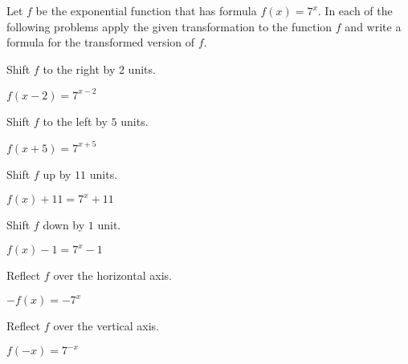 \begin{exercises}
\begin{problem}
Let $f$ be the exponential function that has formula $f(x)=7^x$. In each of the following 
problems apply the given transformation to the function $f$ and 
write a formula for the transformed version of $f$.
\begin{multicols}{2}
	\begin{subproblem}
		Shift $f$ to the right by $2$ units. 
		\begin{shortsolution}
			$f(x-2)=7^{x-2}$
		\end{shortsolution}
	\end{subproblem}
	\begin{subproblem}
		Shift $f$ to the left by $5$ units. 
		\begin{shortsolution}
			$f(x+5)=7^{x+5}$
		\end{shortsolution}
	\end{subproblem}
	\begin{subproblem}
		Shift $f$ up by $11$ units. 
		\begin{shortsolution}
			$f(x)+11=7^x+11$
		\end{shortsolution}
	\end{subproblem}
	\begin{subproblem}
		Shift $f$ down by $1$ unit. 
		\begin{shortsolution}
			$f(x)-1=7^x-1$
		\end{shortsolution}
	\end{subproblem}
	\begin{subproblem}
		Reflect $f$ over the horizontal axis.
		\begin{shortsolution}
			$-f(x)=-7^x$ 
		\end{shortsolution}
	\end{subproblem}
	\begin{subproblem}
		Reflect $f$ over the vertical axis.
		\begin{shortsolution}
			$f(-x)=7^{-x}$ 
		\end{shortsolution}
	\end{subproblem}
\end{multicols}
\end{problem}
\begin{problem}

\end{problem}
\end{exercises}
